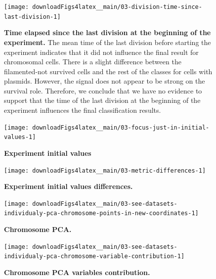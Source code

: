 \documentclass[a4paper, nobind]{templates/ociamthesis}
\begin{document}
\begin{figure}[H]
\texttt{[image: downloadFigs4latex\_\_main/03-division-time-since-last-division-1]} \caption[Time elapsed since the last division at the beginning of the experiment.]{\textbf{Time elapsed since the last division at the beginning of the experiment.} The mean time of the last division before starting the experiment indicates that it did not influence the final result for chromosomal cells. There is a slight difference between the filamented-not survived cells and the rest of the classes for cells with plasmids. However, the signal does not appear to be strong on the survival role. Therefore, we conclude that we have no evidence to support that the time of the last division at the beginning of the experiment influences the final classification results.}\label{fig:03-division-time-since-last-division-1}
\end{figure}





\begin{figure}[H]
\texttt{[image: downloadFigs4latex\_\_main/03-focus-just-in-initial-values-1]} \caption[Experiment initial values.]{\textbf{Experiment initial values}}\label{fig:03-focus-just-in-initial-values-1}
\end{figure}





\begin{figure}[H]
\texttt{[image: downloadFigs4latex\_\_main/03-metric-differences-1]} \caption[Experiment initial values differences.]{\textbf{Experiment initial values differences.}}\label{fig:03-metric-differences-1}
\end{figure}





\begin{figure}[H]
\texttt{[image: downloadFigs4latex\_\_main/03-see-datasets-individualy-pca-chromosome-points-in-new-coordinates-1]} \caption[Chromosome PCA.]{\textbf{Chromosome PCA.}}\label{fig:03-see-datasets-individualy-pca-chromosome-points-in-new-coordinates-1}
\end{figure}





\begin{figure}[H]
\texttt{[image: downloadFigs4latex\_\_main/03-see-datasets-individualy-pca-chromosome-variable-contribution-1]} \caption[Chromosome PCA variables contribution.]{\textbf{Chromosome PCA variables contribution.}}\label{fig:03-see-datasets-individualy-pca-chromosome-variable-contribution-1}
\end{figure}
\end{document}
